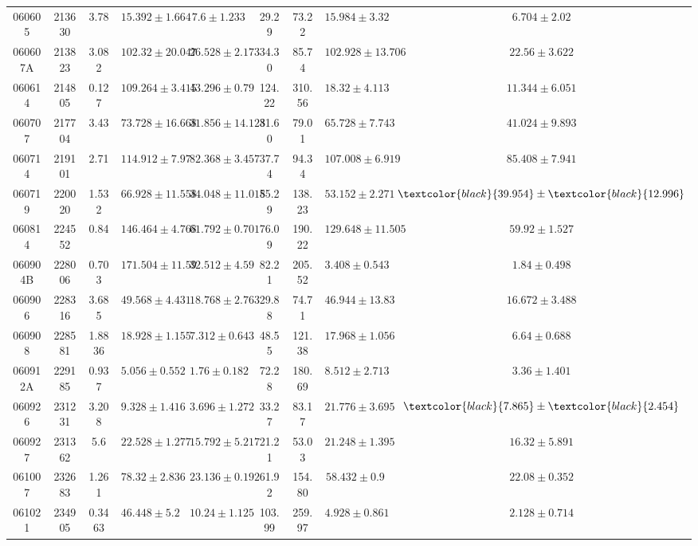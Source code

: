 \documentclass[prd,nofootinbib,preprintnumbers,floatfix]{revtex4}  %
\newcommand{\rthis}[1]{\textcolor{black}{#1}}
\begin{document}
\begin{center}
\begin{longtable*}{|c|c|c|c|c|c|c|c|c|}
060605	&	213630	&	3.78	&	$	15.392	\pm	1.664	$	&	$	7.6	\pm	1.233	$	&	29.29	&	73.22	&	$	15.984	\pm	3.32	$	&	$	6.704	\pm	2.02	$	\\
060607A	&	213823	&	3.082	&	$	102.32	\pm	20.047	$	&	$	26.528	\pm	2.173	$	&	34.30	&	85.74	&	$	102.928	\pm	13.706	$	&	$	22.56	\pm	3.622	$	\\
060614	&	214805	&	0.127	&	$	109.264	\pm	3.415	$	&	$	43.296	\pm	0.79	$	&	124.22	&	310.56	&	$	18.32	\pm	4.113	$	&	$	11.344	\pm	6.051	$	\\
060707	&	217704	&	3.43	&	$	73.728	\pm	16.668	$	&	$	31.856	\pm	14.128	$	&	31.60	&	79.01	&	$	65.728	\pm	7.743	$	&	$	41.024	\pm	9.893	$	\\
060714	&	219101	&	2.71	&	$	114.912	\pm	7.97	$	&	$	82.368	\pm	3.457	$	&	37.74	&	94.34	&	$	107.008	\pm	6.919	$	&	$	85.408	\pm	7.941	$	\\
060719	&	220020	&	1.532	&	$	66.928	\pm	11.558	$	&	$	34.048	\pm	11.018	$	&	55.29	&	138.23	&	$	53.152	\pm	2.271	$	&	$	\rthis{39.954}	\pm	\rthis{12.996}	$	\\
060814	&	224552	&	0.84	&	$	146.464	\pm	4.768	$	&	$	61.792	\pm	0.701	$	&	76.09	&	190.22	&	$	129.648	\pm	11.505	$	&	$	59.92	\pm	1.527	$	\\
060904B	&	228006	&	0.703	&	$	171.504	\pm	11.59	$	&	$	32.512	\pm	4.59	$	&	82.21	&	205.52	&	$	3.408	\pm	0.543	$	&	$	1.84	\pm	0.498	$	\\
060906	&	228316	&	3.685	&	$	49.568	\pm	4.431	$	&	$	18.768	\pm	2.763	$	&	29.88	&	74.71	&	$	46.944	\pm	13.83	$	&	$	16.672	\pm	3.488	$	\\
060908	&	228581	&	1.8836	&	$	18.928	\pm	1.155	$	&	$	7.312	\pm	0.643	$	&	48.55	&	121.38	&	$	17.968	\pm	1.056	$	&	$	6.64	\pm	0.688	$	\\
060912A	&	229185	&	0.937	&	$	5.056	\pm	0.552	$	&	$	1.76	\pm	0.182	$	&	72.28	&	180.69	&	$	8.512	\pm	2.713	$	&	$	3.36	\pm	1.401	$	\\
060926	&	231231	&	3.208	&	$	9.328	\pm	1.416	$	&	$	3.696	\pm	1.272	$	&	33.27	&	83.17	&	$	21.776	\pm	3.695	$	&	$	\rthis{7.865}	\pm	\rthis{2.454}	$	\\
060927	&	231362	&	5.6	&	$	22.528	\pm	1.277	$	&	$	15.792	\pm	5.217	$	&	21.21	&	53.03	&	$	21.248	\pm	1.395	$	&	$	16.32	\pm	5.891	$	\\
061007	&	232683	&	1.261	&	$	78.32	\pm	2.836	$	&	$	23.136	\pm	0.192	$	&	61.92	&	154.80	&	$	58.432	\pm	0.9	$	&	$	22.08	\pm	0.352	$	\\
061021	&	234905	&	0.3463	&	$	46.448	\pm	5.2	$	&	$	10.24	\pm	1.125	$	&	103.99	&	259.97	&	$	4.928	\pm	0.861	$	&	$	2.128	\pm	0.714	$	\\

\end{longtable*}
\end{center}
\end{document}
